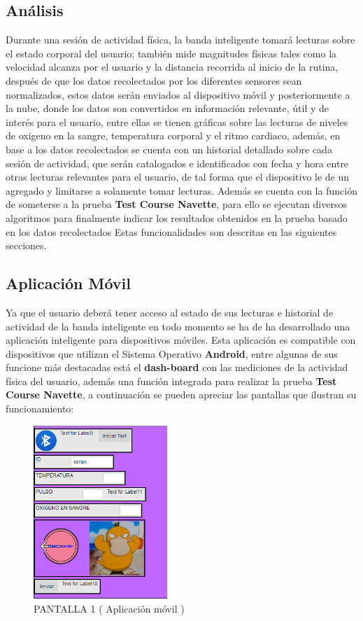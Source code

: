 \documentclass[osajnl,twocolumn,showpacs,superscriptaddress,10pt]{revtex4-1}
\begin{document}
\subsection{Análisis}
    Durante una sesión de actividad física, la banda inteligente tomará lecturas sobre el estado corporal del usuario; también mide magnitudes físicas tales como la velocidad alcanza por el usuario y la distancia recorrida al inicio de la rutina, después de que los datos recolectados por los diferentes sensores sean normalizados, estos datos serán enviados al dispositivo móvil y posteriormente a la nube, donde los datos son convertidos en información relevante, útil y de interés para el usuario, entre ellas se tienen gráficas sobre las lecturas de niveles de oxigeno en la sangre, temperatura corporal y el ritmo cardiaco, además, en base a los datos recolectados se cuenta con un historial detallado sobre cada sesión de actividad, que serán catalogados e identificados con fecha y hora entre otras lecturas relevantes para el usuario, de tal forma que el dispositivo le de un agregado y limitarse a solamente tomar lecturas. Además se cuenta con la función de someterse a la prueba \textbf{Test Course Navette}, para ello se ejecutan diversos algoritmos para finalmente indicar los resultados obtenidos en la prueba basado en los datos recolectados Estas funcionalidades son descritas en las siguientes secciones.
    
\subsection{Aplicación Móvil}
    Ya que el usuario deberá tener acceso al estado de sus lecturas e historial de actividad de la banda inteligente en todo momento se ha de ha desarrollado una aplicación inteligente para dispositivos móviles. Esta aplicación es compatible con dispositivos que utilizan el Sistema Operativo \textbf{Android}, entre algunas de sus funcione más destacadas está el \textbf{dash-board} con las mediciones de la actividad física del usuario, además una función integrada para realizar la prueba \textbf{Test Course Navette}, a continuación se pueden apreciar las pantallas que ilustran su funcionamiento:
    
\begin{figure} [H] \centering 
\caption{PANTALLA 1 ( Aplicación móvil )}
\includegraphics[width=0.45\textwidth]{PantallaPrincipal.png} 
\end{figure}
\end{document}
